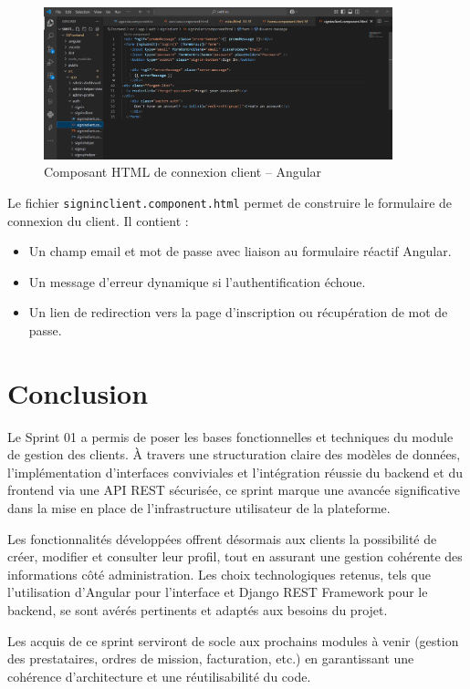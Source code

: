 \vspace{0.5cm}

\begin{figure}[H]
    \centering
    \includegraphics[width=0.9\textwidth]{figures/main.png}
    \caption{Composant HTML de connexion client – Angular}
\end{figure}

\noindent
Le fichier \texttt{signinclient.component.html} permet de construire le formulaire de connexion du client. Il contient :
\begin{itemize}
    \item Un champ email et mot de passe avec liaison au formulaire réactif Angular.
    \item Un message d’erreur dynamique si l’authentification échoue.
    \item Un lien de redirection vers la page d’inscription ou récupération de mot de passe.
\end{itemize}
\section*{Conclusion}

Le Sprint 01 a permis de poser les bases fonctionnelles et techniques du module de gestion des clients. À travers une structuration claire des modèles de données, l’implémentation d’interfaces conviviales et l’intégration réussie du backend et du frontend via une API REST sécurisée, ce sprint marque une avancée significative dans la mise en place de l’infrastructure utilisateur de la plateforme.

Les fonctionnalités développées offrent désormais aux clients la possibilité de créer, modifier et consulter leur profil, tout en assurant une gestion cohérente des informations côté administration. Les choix technologiques retenus, tels que l’utilisation d’Angular pour l’interface et Django REST Framework pour le backend, se sont avérés pertinents et adaptés aux besoins du projet.

Les acquis de ce sprint serviront de socle aux prochains modules à venir (gestion des prestataires, ordres de mission, facturation, etc.) en garantissant une cohérence d’architecture et une réutilisabilité du code.



